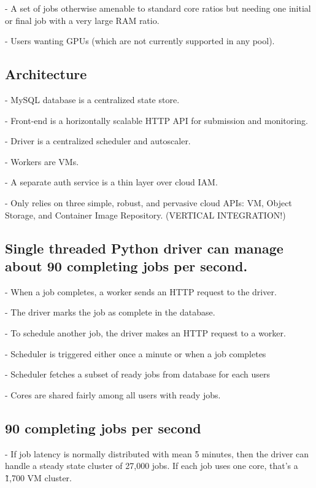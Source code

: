 \documentclass[sigconf, nonacm]{acmart}
\begin{document}
        - A set of jobs otherwise amenable to standard core ratios but needing one initial or final job with a very large RAM ratio.

        - Users wanting GPUs (which are not currently supported in any pool).

\subsection{Architecture}

    - MySQL database is a centralized state store.

    - Front-end is a horizontally scalable HTTP API for submission and monitoring.

    - Driver is a centralized scheduler and autoscaler.

    - Workers are VMs.

    - A separate auth service is a thin layer over cloud IAM.

    - Only relies on three simple, robust, and pervasive cloud APIs: VM, Object Storage, and Container Image Repository. (VERTICAL INTEGRATION!)

\subsection{Single threaded Python driver can manage about 90 completing jobs per second.}

    - When a job completes, a worker sends an HTTP request to the driver.

    - The driver marks the job as complete in the database.

    - To schedule another job, the driver makes an HTTP request to a worker.

    - Scheduler is triggered either once a minute or when a job completes

      - Scheduler fetches a subset of ready jobs from database for each users

      - Cores are shared fairly among all users with ready jobs.

\subsection{90 completing jobs per second}

    - If job latency is normally distributed with mean 5 minutes, then the driver can handle a steady state cluster of 27,000 jobs. If each job uses one core, that’s a \~1,700 VM cluster.
\end{document}
